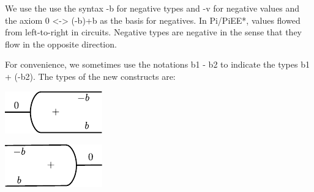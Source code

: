 \documentclass[preprint]{sigplanconf}
\begin{document}
We use the use the syntax {{-b}} for negative types and {{-v}} for
negative values and the axiom {{0 <-> (-b)+b}} as the basis for
negatives. In {{Pi}}/{{PiEE*}}, values flowed from left-to-right in
circuits. Negative types are negative in the sense that they flow in
the opposite direction. 

%

For convenience, we sometimes use the notations {{b1 - b2}} to
indicate the types {{b1 + (-b2)}}.  The types of the new constructs
are:
\vspace{-15pt}
\begin{multicols}{2}  

\end{multicols}


\begin{multicols}{2}
\begin{center}
  \includegraphics{diagrams/eta.pdf}
\end{center}
  
\begin{center}
 \includegraphics{diagrams/eps.pdf}
\end{center}
\end{multicols}

\begin{multicols}{2}
\begin{center}
\end{center}
  
\begin{center}
\end{center}  
\end{multicols}
\end{document}
